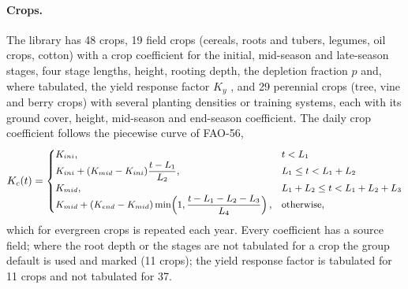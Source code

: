 \documentclass[preprint,12pt]{elsarticle}
\begin{document}
\paragraph{Crops.}
The library has 48 crops, 19 field crops (cereals, roots and tubers, legumes, oil crops, cotton) with a crop coefficient for the initial, mid-season and late-season stages, four stage lengths, height, rooting depth, the depletion fraction $p$ and, where tabulated, the yield response factor $K_y$ \cite{Doorenbos1979,Allen1998}, and 29 perennial crops (tree, vine and berry crops) with several planting densities or training systems, each with its ground cover, height, mid-season and end-season coefficient. The daily crop coefficient follows the piecewise curve of FAO-56,
\begin{equation}\label{eq:kc}
\small K_c(t)=\begin{cases}K_{ini}, & t<L_1\\ K_{ini}+(K_{mid}-K_{ini})\dfrac{t-L_1}{L_2}, & L_1\le t<L_1+L_2\\ K_{mid}, & L_1+L_2\le t<L_1+L_2+L_3\\ K_{mid}+(K_{end}-K_{mid})\min\!\left(1,\dfrac{t-L_1-L_2-L_3}{L_4}\right), & \text{otherwise,}\end{cases}
\end{equation}
which for evergreen crops is repeated each year. Every coefficient has a source field; where the root depth or the stages are not tabulated for a crop the group default is used and marked (11 crops); the yield response factor is tabulated for 11 crops and not tabulated for 37.
\end{document}
